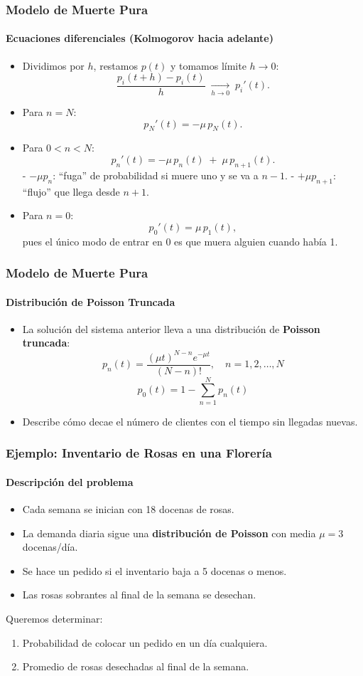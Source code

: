 \documentclass{beamer}
\begin{document}
\begin{frame}
\frametitle{Modelo de Muerte Pura}
\framesubtitle{Ecuaciones diferenciales (Kolmogorov hacia adelante)}

\begin{itemize}
  \item Dividimos por \(h\), restamos \(p(t)\) y tomamos límite \(h\to0\):
  \[
    \frac{p_i(t+h)-p_i(t)}{h}\;\xrightarrow[h\to0]{}\;p_i'(t).
  \]
  \medskip
  \item Para \(n=N\):  
    \[
      p_N'(t)
      = -\mu\,p_N(t).
    \]
  \medskip
  \item Para \(0<n<N\):  
    \[
      p_n'(t)
      = -\mu\,p_n(t)
      \;+\;\mu\,p_{n+1}(t).
    \]
    - \(-\mu p_n\): “fuga” de probabilidad si muere uno y se va a \(n-1\).  
    - \(+\mu p_{n+1}\): “flujo” que llega desde \(n+1\).
  \medskip
  \item Para \(n=0\):  
    \[
      p_0'(t)
      = \mu\,p_1(t),
    \]
    pues el único modo de entrar en 0 es que muera alguien cuando había 1.
\end{itemize}
\end{frame}


\begin{frame}
\frametitle{Modelo de Muerte Pura}
\framesubtitle{Distribución de Poisson Truncada}

\begin{itemize}
    \item La solución del sistema anterior lleva a una distribución de \textbf{Poisson truncada}:
    \[
    p_n(t) = \frac{(\mu t)^{N - n} e^{-\mu t}}{(N - n)!}, \quad n = 1, 2, \dots, N
    \]
    \[
    p_0(t) = 1 - \sum_{n = 1}^{N} p_n(t)
    \]

    \item Describe cómo decae el número de clientes con el tiempo sin llegadas nuevas.
\end{itemize}
\end{frame}

\begin{frame}
\frametitle{Ejemplo: Inventario de Rosas en una Florería}
\framesubtitle{Descripción del problema}

\begin{itemize}
    \item Cada semana se inician con 18 docenas de rosas.
    \item La demanda diaria sigue una \textbf{distribución de Poisson} con media $\mu = 3$ docenas/día.
    \item Se hace un pedido si el inventario baja a 5 docenas o menos.
    \item Las rosas sobrantes al final de la semana se desechan.
\end{itemize}

Queremos determinar:
\begin{enumerate}
    \item Probabilidad de colocar un pedido en un día cualquiera.
    \item Promedio de rosas desechadas al final de la semana.
\end{enumerate}
\end{frame}
\end{document}
